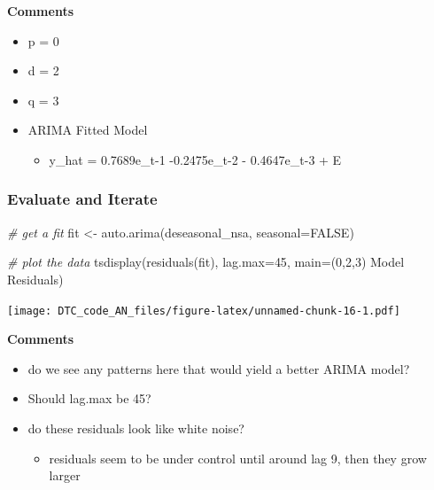 \documentclass[
]{article}
\newenvironment{Shaded}{\begin{snugshade}}{\end{snugshade}}
\newcommand{\AttributeTok}[1]{\textcolor[rgb]{0.77,0.63,0.00}{#1}}
\newcommand{\CommentTok}[1]{\textcolor[rgb]{0.56,0.35,0.01}{\textit{#1}}}
\newcommand{\ConstantTok}[1]{\textcolor[rgb]{0.00,0.00,0.00}{#1}}
\newcommand{\DecValTok}[1]{\textcolor[rgb]{0.00,0.00,0.81}{#1}}
\newcommand{\FunctionTok}[1]{\textcolor[rgb]{0.00,0.00,0.00}{#1}}
\newcommand{\NormalTok}[1]{#1}
\newcommand{\OtherTok}[1]{\textcolor[rgb]{0.56,0.35,0.01}{#1}}
\newcommand{\StringTok}[1]{\textcolor[rgb]{0.31,0.60,0.02}{#1}}
\providecommand{\tightlist}{%
  \setlength{\itemsep}{0pt}\setlength{\parskip}{0pt}}
\begin{document}
\textbf{Comments}

\begin{itemize}
\item
  p = 0
\item
  d = 2
\item
  q = 3
\item
  ARIMA Fitted Model

  \begin{itemize}
  \tightlist
  \item
    y\_hat = 0.7689e\_t-1 -0.2475e\_t-2 - 0.4647e\_t-3 + E
  \end{itemize}
\end{itemize}

\hypertarget{evaluate-and-iterate}{%
\subsubsection{Evaluate and Iterate}\label{evaluate-and-iterate}}

\begin{Shaded}
\begin{Highlighting}[]
\CommentTok{\# get a fit}
\NormalTok{fit }\OtherTok{\textless{}{-}} \FunctionTok{auto.arima}\NormalTok{(deseasonal\_nsa, }\AttributeTok{seasonal=}\ConstantTok{FALSE}\NormalTok{)}

\CommentTok{\# plot the data}
\FunctionTok{tsdisplay}\NormalTok{(}\FunctionTok{residuals}\NormalTok{(fit), }\AttributeTok{lag.max=}\DecValTok{45}\NormalTok{, }\AttributeTok{main=}\StringTok{\textquotesingle{}(0,2,3) Model Residuals\textquotesingle{}}\NormalTok{)}
\end{Highlighting}
\end{Shaded}

\texttt{[image: DTC\_code\_AN\_files/figure-latex/unnamed-chunk-16-1.pdf]}

\textbf{Comments}

\begin{itemize}
\item
  do we see any patterns here that would yield a better ARIMA model?
\item
  Should lag.max be 45?
\item
  do these residuals look like white noise?

  \begin{itemize}
  \tightlist
  \item
    residuals seem to be under control until around lag 9, then they
    grow larger
  \end{itemize}
\end{itemize}
\end{document}
